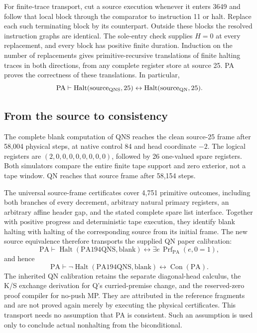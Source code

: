For finite-trace transport, cut a source execution whenever it enters
3649 and follow that local block through the comparator to instruction 11
or halt. Replace each such terminating block by its counterpart. Outside
these blocks the resolved instruction graphs are identical. The sole-entry
check supplies $H=0$ at every replacement, and every block has positive
finite duration. Induction on the number of replacements gives
primitive-recursive translations of finite halting traces in both
directions, from any complete register store at source 25. PA proves
the correctness of these translations. In particular,
\[
 \mathrm{PA}\vdash
 \operatorname{Halt}(\mathrm{source}_{\rm QNS},25)
 \leftrightarrow
 \operatorname{Halt}(\mathrm{source}_{\rm QN},25).
\]

\subsection{From the source to consistency}

The complete blank computation of QNS reaches the clean source-25 frame
after 58,004 physical steps, at native control 84 and head coordinate
$-2$. The logical registers are $(2,0,0,0,0,0,0,0,0)$, followed by 26
one-valued spare registers. Both simulators compare the entire finite
tape support and zero exterior, not a tape window. QN reaches that
source frame after 58,154 steps.

The universal source-frame certificates cover 4,751 primitive outcomes,
including both branches of every decrement, arbitrary natural primary
registers, an arbitrary affine header gap, and the stated complete spare
list interface. Together with positive progress and deterministic tape
execution, they identify blank halting with halting of the corresponding
source from its initial frame. The new source equivalence therefore
transports the supplied QN paper calibration:
\[
 \mathrm{PA}\vdash
 \operatorname{Halt}(\mathrm{PA194QNS},\mathrm{blank})
 \leftrightarrow \exists e\,
       \operatorname{Prf}_{\mathrm{PA}}(e,0=1),
\]
and hence
\[
 \mathrm{PA}\vdash
 \neg\operatorname{Halt}(\mathrm{PA194QNS},\mathrm{blank})
 \leftrightarrow\operatorname{Con}(\mathrm{PA}).
\]
The inherited QN calibration retains the separate diagonal-head calculus,
the K/S exchange derivation for Q's curried-premise change, and the
reserved-zero proof compiler for no-push MP. They are attributed in the
reference fragments and are not proved again merely by executing the
physical certificates. This transport needs no assumption that PA is
consistent. Such an assumption is used only to conclude actual
nonhalting from the biconditional.

